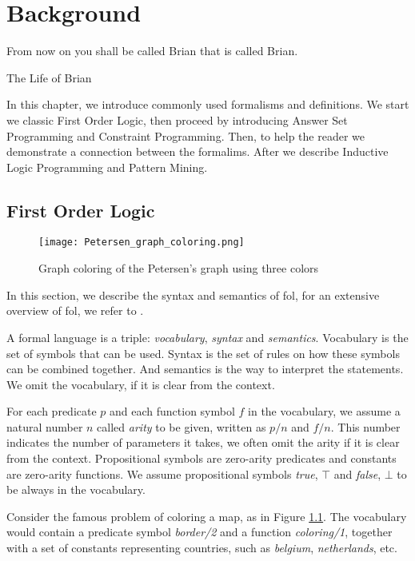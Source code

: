 \chapter{Background} \label{ch:background}
\epigraph{From now on you shall be called Brian that is called Brian.}{The Life of Brian}
In this chapter, we introduce commonly used formalisms and definitions. We start we classic First Order Logic, then proceed by introducing Answer Set Programming and Constraint Programming. Then, to help the reader we demonstrate a connection between the formalims. After we describe Inductive Logic Programming and Pattern Mining.

\section{First Order Logic}
\begin{figure}[t]
  \centering
  \texttt{[image: Petersen\_graph\_coloring.png]}
  \caption{Graph coloring of the Petersen's graph using three colors}
  \label{fig:petersen_coloring}
\end{figure}
In this section, we describe the syntax and semantics of \acrshort{fol},
for an extensive overview of \acrshort{fol}, we refer to \textcite{fo_overview}.

A formal language is a triple: \textit{vocabulary}, \textit{syntax} and \textit{semantics}. Vocabulary is the set of symbols that can be used. Syntax is the set of rules on how these symbols can be combined together. And semantics is the way to interpret the statements. We omit the vocabulary, if it is clear from the context.

For each predicate $p$ and each function symbol $f$ in the vocabulary, we assume a natural number $n$ called \textit{arity} to be given, written as $p/n$ and $f/n$. This number indicates the number of parameters it takes, we often omit the arity if it is clear from the context. Propositional symbols are zero-arity predicates and constants are zero-arity functions. 
We assume propositional symbols \textit{true}, $\top$ and \textit{false}, $\bot$ to be always in the vocabulary.

\begin{example}\label{example:predicates_and_functions}
  Consider the famous problem of coloring a map, as in Figure \ref{fig:petersen_coloring}. The vocabulary would contain a predicate symbol \textit{border/2} and a function \textit{coloring/1}, together with a set of constants representing countries, such as \textit{belgium}, \textit{netherlands}, etc.
\end{example}

